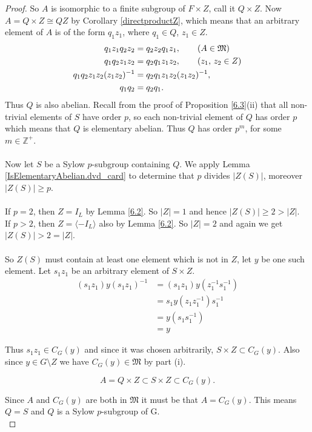 \begin{proof}
  So $A$ is isomorphic to a finite subgroup of $F \times Z$, call it $Q \times Z$. Now $A = Q \times Z \cong QZ$ by Corollary \ref{directproductZ}, which means that an arbitrary element of $A$ is of the form $q_1z_1$, where $q_1 \in Q$, $z_1 \in Z$.
  \begin{align*} q_1z_1q_2z_2 &= q_2z_2 q_1z_1, \tag{$A \in \mathfrak{M}$}
  \\ q_1q_2z_1z_2 &= q_2q_1z_1z_2, \tag{$z_1$, $z_2 \in Z$}
  \\  q_1q_2z_1z_2(z_1z_2)^{-1} &= q_2q_1z_1z_2(z_1z_2)^{-1},
  \\ q_1q_2 &= q_2q_1.
  \end{align*}
  Thus $Q$ is also abelian. Recall from the proof of Proposition \ref{6.3}(ii) that all non-trivial elements of $S$ have order $p$, so each non-trivial element of $Q$ has order $p$ which means that $Q$ is elementary abelian. Thus $Q$ has order $p^m$, for some $m \in \mathbb{Z}^+$. \\
  \\
  Now let $S$ be a Sylow $p$-subgroup containing $Q$. We apply Lemma \ref{IsElementaryAbelian.dvd_card} to determine that $p$ divides $|Z(S)|$, moreover $|Z(S)| \geq p$. \\
  \\
  If $p=2$, then $Z=I_L$ by Lemma \ref{6.2}. So $|Z| = 1$ and hence $|Z(S)| \geq 2 > |Z|$.\\
  If $p > 2$, then  $Z = \langle - I_L \rangle$ also by Lemma \ref{6.2}. So $|Z| = 2$ and again we get $|Z(S)| > 2 = |Z|$. \\
  \\
  So $Z(S)$ must contain at least one element which is not in $Z$, let $y$ be one such element. Let $s_1z_1$ be an arbitrary element of $S \times Z$.
  \begin{align*}
  (s_1z_1)y(s_1z_1)^{-1} &= (s_1z_1)y(z_1^{-1}s_1^{-1})
  \\ &= s_1y(z_1z_1^{-1})s_1^{-1} \tag{since $y \in L$, $z_1 \in Z$}
  \\ &= y(s_1s_1^{-1}) \tag{since $s_1 \in S$, $y \in Z(S)$}
  \\ &= y
  \end{align*}
  
  Thus $s_1z_1 \in C_G(y)$ and since it was chosen arbitrarily, $S \times Z \subset C_G(y)$. Also since $y \in G \! \setminus \! Z$ we have $C_G(y) \in \mathfrak{M}$ by part (i).
  
  \begin{equation*}
  A = Q \times Z \subset S \times Z \subset C_G(y).
  \end{equation*}
  
  Since $A$ and $C_G(y)$ are both in $\mathfrak{M}$ it must be that $A = C_G(y)$. This means $Q = S$ and $Q$ is a Sylow $p$-subgroup of G.\\
\end{proof}

